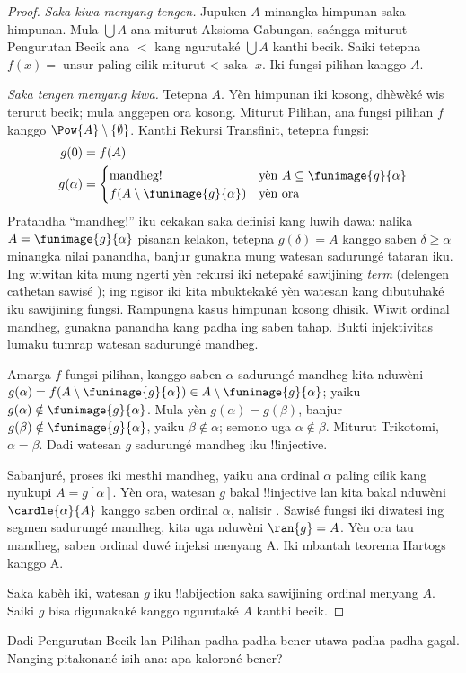 \documentclass[../../../include/open-logic-section]{subfiles}
\begin{document}
\begin{proof}
\emph{Saka kiwa menyang tengen.} Jupuken $A$ minangka himpunan saka
himpunan. Mula $\bigcup A$ ana miturut Aksioma Gabungan, saéngga
miturut Pengurutan Becik ana $<$ kang ngurutaké $\bigcup A$ kanthi becik.
Saiki tetepna $f(x) = \text{unsur paling cilik miturut $<$ saka }x$.
Iki fungsi pilihan kanggo $A$.

\emph{Saka tengen menyang kiwa.} Tetepna $A$. Yèn himpunan iki kosong,
dhèwèké wis terurut becik; mula anggepen ora kosong. Miturut Pilihan,
ana fungsi pilihan $f$ kanggo $\Pow{A} \setminus \{\emptyset\}$.
Kanthi Rekursi Transfinit, tetepna fungsi:
\begin{align*}
	g(0) &= f(A)\\
	g(\alpha) &=
		\begin{cases}
			\text{mandheg!{}} &\text{yèn }A \subseteq \funimage{g}{\alpha}\\
			f(A \setminus \funimage{g}{\alpha}) & \text{yèn ora}\\	
		\end{cases}
\end{align*}
Pratandha ``mandheg!'' iku cekakan saka definisi kang luwih dawa:
nalika $A = \funimage{g}{\alpha}$ pisanan kelakon, tetepna
$g(\delta) = A$ kanggo saben $\delta \geq \alpha$ minangka nilai
panandha, banjur gunakna mung watesan sadurungé tataran iku. Ing wiwitan
kita mung ngerti yèn rekursi iki netepaké sawijining \emph{term}
(delengen cathetan sawisé
); ing ngisor iki
kita mbuktekaké yèn watesan kang dibutuhaké iku sawijining fungsi.
Rampungna kasus himpunan kosong dhisik. Wiwit ordinal mandheg, gunakna panandha kang padha ing saben tahap. Bukti injektivitas lumaku tumrap watesan sadurungé mandheg.

Amarga $f$ fungsi pilihan, kanggo saben $\alpha$ sadurungé mandheg
kita nduwèni $g(\alpha) =
f(A \setminus \funimage{g}{\alpha}) \in A \setminus
\funimage{g}{\alpha}$; yaiku $g(\alpha) \notin \funimage{g}{\alpha}$.
Mula yèn $g(\alpha) = g(\beta)$, banjur $g(\beta) \notin
\funimage{g}{\alpha}$, yaiku $\beta \notin \alpha$; semono uga
$\alpha \notin \beta$. Miturut Trikotomi, $\alpha = \beta$.
Dadi watesan $g$ sadurungé mandheg iku !!{injective}.

Sabanjuré, proses iki mesthi mandheg, yaiku ana ordinal $\alpha$ paling
cilik kang nyukupi $A = g[\alpha]$. Yèn ora, watesan $g$ bakal
!!{injective} lan kita bakal nduwèni $\cardle{\alpha}{A}$ kanggo
saben ordinal $\alpha$, nalisir .
Sawisé fungsi iki diwatesi ing segmen sadurungé mandheg, kita uga nduwèni
$\ran{g} = A$.
Yèn ora tau mandheg, saben ordinal duwé injeksi menyang A. Iki mbantah teorema Hartogs kanggo A.

Saka kabèh iki, watesan $g$ iku !!a{bijection} saka sawijining ordinal
menyang $A$. Saiki $g$ bisa digunakaké kanggo ngurutaké $A$ kanthi becik.
\end{proof}

Dadi Pengurutan Becik lan Pilihan padha-padha bener utawa padha-padha
gagal. Nanging pitakonané isih ana: apa kaloroné bener?
\end{document}
